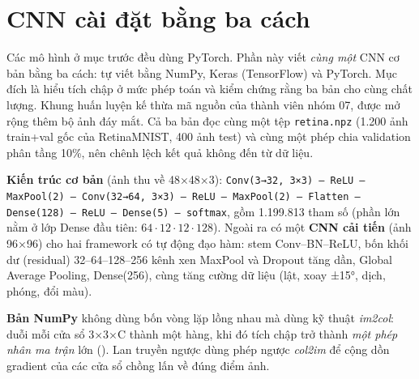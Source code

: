 
\section{CNN cài đặt bằng ba cách}
\label{sec:ch3-three}

Các mô hình ở mục trước đều dùng PyTorch. Phần này viết \emph{cùng một} CNN cơ bản bằng ba cách: tự viết bằng NumPy, Keras (TensorFlow) và PyTorch. Mục đích là hiểu tích chập ở mức phép toán và kiểm chứng rằng ba bản cho cùng chất lượng. Khung huấn luyện kế thừa mã nguồn của thành viên nhóm 07, được mở rộng thêm bộ ảnh đáy mắt. Cả ba bản đọc cùng một tệp \texttt{retina.npz} (1.200 ảnh train+val gốc của RetinaMNIST, 400 ảnh test) và cùng một phép chia validation phân tầng 10\%, nên chênh lệch kết quả không đến từ dữ liệu.

\textbf{Kiến trúc cơ bản} (ảnh thu về 48×48×3): \texttt{Conv(3→32, 3×3) – ReLU – MaxPool(2) – Conv(32→64, 3×3) – ReLU – MaxPool(2) – Flatten – Dense(128) – ReLU – Dense(5) – softmax}, gồm 1.199.813 tham số (phần lớn nằm ở lớp Dense đầu tiên: $64\cdot12\cdot12\cdot128$). Ngoài ra có một \textbf{CNN cải tiến} (ảnh 96×96) cho hai framework có tự động đạo hàm: stem Conv–BN–ReLU, bốn khối dư (residual) 32–64–128–256 kênh xen MaxPool và Dropout tăng dần, Global Average Pooling, Dense(256), cùng tăng cường dữ liệu (lật, xoay ±15°, dịch, phóng, đổi màu).

\textbf{Bản NumPy} không dùng bốn vòng lặp lồng nhau mà dùng kỹ thuật \emph{im2col}: duỗi mỗi cửa sổ 3×3×C thành một hàng, khi đó tích chập trở thành \emph{một phép nhân ma trận} lớn (). Lan truyền ngược dùng phép ngược \emph{col2im} để cộng dồn gradient của các cửa sổ chồng lấn về đúng điểm ảnh.

